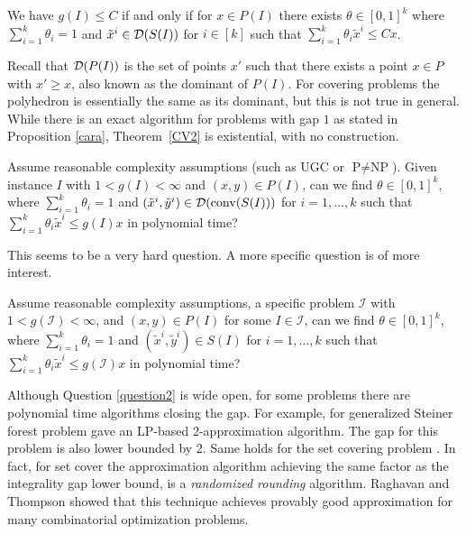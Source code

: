 \begin{thm} \label{CV2}
	We have $g(I) \leq C$ if and only if for  $x\in P(I)$ there exists $\theta \in [0,1]^k$ where $\sum_{i=1}^{k}\theta_i =1$ and $\tilde{x}^i\in \operatorname{\mathcal{D}}(S(I))$ for $i\in [k]$ such that $\sum_{i=1}^{k}\theta_i \tilde{x}^i\leq Cx$.
\end{thm}
Recall that $\operatorname{\mathcal{D}}(P(I))$ is the set of points $x'$ such that there exists a point $x\in P$ with $x'\geq x$, also known as the dominant of $P(I)$. For covering problems the polyhedron is essentially the same as its dominant, but this is not true in general. While there is an exact algorithm for problems with gap $1$ as stated in Proposition \ref{cara}, Theorem~\ref{CV2} is existential, with no construction.
\iffalse

\begin{question*}\label{question1}
	Assume reasonable complexity assumptions (such as UGC or $\textrm{P}\neq \textrm{NP}$). Given instance $I$ with $1<g(I)<\infty$ and $(x,y)\in P(I)$, can we find $\theta \in [0,1]^k$, where $\sum_{i=1}^{k}\theta_i =1$ and $(\tilde{x}^i,\tilde{y}^i)\in \operatorname{\mathcal{D}}(\operatorname{conv}(S(I)))$ for $i=1,\ldots,k$ such that $\sum_{i=1}^{k}\theta_i \tilde{x}^i\leq g(I)x$ in polynomial time?
\end{question*}

This seems to be a very hard question. A more specific question is of more interest.

\begin{question}\label{question2}
	Assume reasonable complexity assumptions, a specific problem $\mathcal{I}$ with  $1<g({\mathcal{I}})<\infty$, and $(x,y)\in P(I)$ for some $I\in \mathcal{I}$, can we find $\theta \in [0,1]^k$, where $\sum_{i=1}^{k}\theta_i =1$ and $(\tilde{x}^i,\tilde{y}^i)\in S(I)$ for $i=1,\ldots,k$ such that $\sum_{i=1}^{k}\theta_i \tilde{x}^i\leq g(\mathcal{I})x$ in polynomial time?
\end{question}
Although Question \ref{question2} is wide open, for some problems there are polynomial time algorithms closing the gap. For example, for generalized Steiner forest problem \cite{jain} gave an LP-based 2-approximation algorithm. The gap for this problem is also lower bounded by 2. Same holds for the set covering problem \cite{randomizedrounding}. In fact, for set cover the approximation algorithm achieving the same factor as the integrality gap lower bound, is a \textit{randomized rounding} algorithm. Raghavan and Thompson \cite{randomizedrounding} showed that this technique achieves provably good approximation for many combinatorial optimization problems.  

